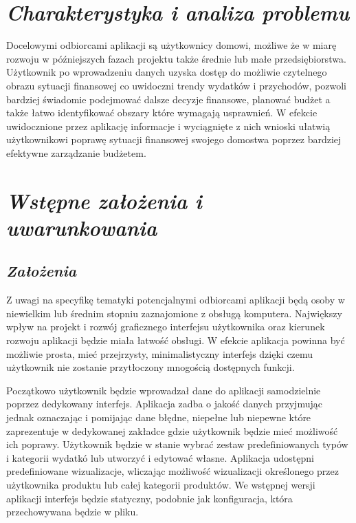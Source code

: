 \documentclass[a4paper,10pt, twoside]{report}
\newcommand{\customstylechapter}[1]{\large{\textit{#1}}}
\newcommand{\customstylesection}[1]{\textbf{\textit{#1}}}
\begin{document}
\chapter{\customstylechapter{Charakterystyka i analiza problemu}}



{Docelowymi odbiorcami aplikacji są użytkownicy domowi, możliwe że w miarę 
rozwoju w późniejszych fazach projektu także średnie lub małe przedsiębiorstwa. 
Użytkownik po wprowadzeniu danych uzyska dostęp do możliwie czytelnego obrazu 
sytuacji finansowej co uwidoczni trendy wydatków i przychodów, pozwoli bardziej 
świadomie podejmować dalsze decyzje finansowe, planować budżet a także łatwo 
identyfikować obszary które wymagają usprawnień. W efekcie uwidocznione przez 
aplikację informacje i wyciągnięte z nich wnioski ułatwią użytkownikowi poprawę 
sytuacji finansowej swojego domostwa poprzez bardziej efektywne zarządzanie 
budżetem.}
%
\chapter{\customstylechapter{Wstępne założenia i uwarunkowania}}
\section{\customstylesection{Założenia}}
{Z uwagi na specyfikę tematyki potencjalnymi odbiorcami aplikacji będą osoby 
w niewielkim lub średnim stopniu zaznajomione z obsługą komputera. Największy
wpływ na projekt i rozwój graficznego interfejsu użytkownika oraz kierunek
 rozwoju aplikacji będzie miała łatwość obsługi. W efekcie aplikacja powinna
 być możliwie prosta, mieć przejrzysty, minimalistyczny interfejs dzięki 
czemu użytkownik nie zostanie przytłoczony mnogością dostępnych funkcji.}

{Początkowo użytkownik będzie wprowadzał dane do aplikacji samodzielnie poprzez 
dedykowany interfejs. Aplikacja zadba o jakość danych przyjmując jednak 
oznaczając i pomijając dane błędne, niepełne lub niepewne które zaprezentuje w 
dedykowanej zakładce gdzie użytkownik będzie mieć możliwość ich poprawy. 
Użytkownik będzie w stanie wybrać zestaw predefiniowanych typów i kategorii 
wydatkó lub utworzyć i edytować własne. Aplikacja udostępni predefiniowane 
wizualizacje, wliczając możliwość wizualizacji określonego przez użytkownika 
produktu lub całej kategorii produktów. We wstępnej wersji aplikacji interfejs
będzie statyczny, podobnie jak konfiguracja, która przechowywana będzie w pliku.}
\end{document}
